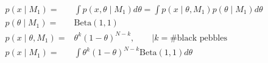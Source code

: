 \documentclass{article}
\begin{document}
\begin{align}
	p(x \mid M_1) =& \int p(x, \theta \mid M_1) d\theta= \int p(x\mid \theta, M_1)p(\theta \mid M_1)d\theta\\
	p(\theta \mid M_1) =& \text{Beta}(1,1)\\	
	p(x\mid \theta, M_1) =& \theta^k (1-\theta)^{N-k}, \qquad | k= \text{\#black pebbles} \\
	p(x \mid M_1) =& \int \theta^k (1-\theta)^{N-k} \text{Beta}(1,1) d\theta
\end{align}
\end{document}
